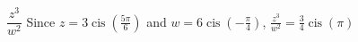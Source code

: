 { $\dfrac{z^3}{w^2}$ }
{ Since $z = 3\operatorname{cis}\left(\frac{5\pi}{6}\right)$ and $w = 6\operatorname{cis}\left(-\frac{\pi}{4}\right)$,  $\frac{z^3}{w^2} =\frac{3}{4}\operatorname{cis}(\pi)$}
